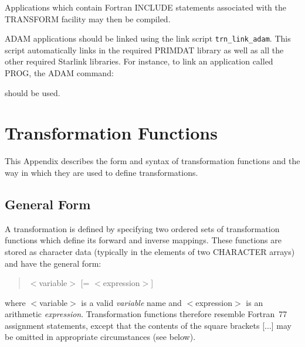 \documentclass[twoside,nolof,11pt]{starlink}
\providecommand{\name}[1]{\small{#1}}
\begin{document}
\begin{quote}
\begin{terminalv}
\end{terminalv}
\end{quote}

Applications which contain Fortran \name{INCLUDE} statements associated with
the \name{TRANSFORM} facility may then be compiled.

ADAM applications should be linked using the link script
\texttt{trn\_link\_adam}.
This script automatically links in the required \name{PRIMDAT} library as
well as all the other required Starlink libraries.
For instance, to link an application called \name{PROG}, the \name{ADAM}
command:

\begin{terminalv}
\end{terminalv}

should be used.

\cleardoublepage
\appendix

\section{Transformation Functions}

\label{appendix_syntax}

This Appendix describes the form and syntax of transformation functions and
the way in which they are used to define transformations.


\subsection{General Form}

A transformation is defined by specifying two ordered sets of transformation
functions which define its forward and inverse mappings.
These functions are stored as character data (typically in the elements of
two \name{CHARACTER} arrays) and have the general form:

\begin{quote}
$<$variable$>$ [= $<$expression$>$]
\end{quote}

where \mbox{$<$variable$>$} is a valid \emph{variable} name and
\mbox{$<$expression$>$} is an arithmetic \emph{expression}.
Transformation functions therefore resemble Fortran~77 assignment
statements, except that the contents of the square brackets \mbox{[...]} may
be omitted in appropriate circumstances (see below).
\end{document}
